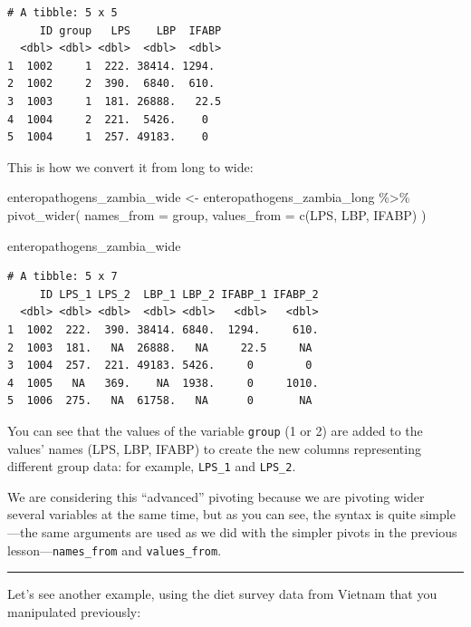 \documentclass[
  letterpaper,
  DIV=11,
  numbers=noendperiod]{scrreprt}
\newenvironment{Shaded}{\begin{snugshade}}{\end{snugshade}}
\newcommand{\AttributeTok}[1]{\textcolor[rgb]{0.40,0.45,0.13}{#1}}
\newcommand{\FunctionTok}[1]{\textcolor[rgb]{0.28,0.35,0.67}{#1}}
\newcommand{\NormalTok}[1]{\textcolor[rgb]{0.00,0.23,0.31}{#1}}
\newcommand{\OtherTok}[1]{\textcolor[rgb]{0.00,0.23,0.31}{#1}}
\newcommand{\SpecialCharTok}[1]{\textcolor[rgb]{0.37,0.37,0.37}{#1}}
\begin{document}
\begin{verbatim}
# A tibble: 5 x 5
     ID group   LPS    LBP  IFABP
  <dbl> <dbl> <dbl>  <dbl>  <dbl>
1  1002     1  222. 38414. 1294. 
2  1002     2  390.  6840.  610. 
3  1003     1  181. 26888.   22.5
4  1004     2  221.  5426.    0  
5  1004     1  257. 49183.    0  
\end{verbatim}

This is how we convert it from long to wide:

\begin{Shaded}
\begin{Highlighting}[]
\NormalTok{enteropathogens\_zambia\_wide }\OtherTok{\textless{}{-}}
\NormalTok{  enteropathogens\_zambia\_long }\SpecialCharTok{\%\textgreater{}\%}
  \FunctionTok{pivot\_wider}\NormalTok{(}
    \AttributeTok{names\_from =}\NormalTok{ group,}
    \AttributeTok{values\_from =} \FunctionTok{c}\NormalTok{(LPS, LBP, IFABP)}
\NormalTok{  )}

\NormalTok{enteropathogens\_zambia\_wide}
\end{Highlighting}
\end{Shaded}

\begin{verbatim}
# A tibble: 5 x 7
     ID LPS_1 LPS_2  LBP_1 LBP_2 IFABP_1 IFABP_2
  <dbl> <dbl> <dbl>  <dbl> <dbl>   <dbl>   <dbl>
1  1002  222.  390. 38414. 6840.  1294.     610.
2  1003  181.   NA  26888.   NA     22.5     NA 
3  1004  257.  221. 49183. 5426.     0        0 
4  1005   NA   369.    NA  1938.     0     1010.
5  1006  275.   NA  61758.   NA      0       NA 
\end{verbatim}

You can see that the values of the variable \texttt{group} (1 or 2) are
added to the values' names (LPS, LBP, IFABP) to create the new columns
representing different group data: for example, \texttt{LPS\_1} and
\texttt{LPS\_2}.

We are considering this ``advanced'' pivoting because we are pivoting
wider several variables at the same time, but as you can see, the syntax
is quite simple---the same arguments are used as we did with the simpler
pivots in the previous lesson---\texttt{names\_from} and
\texttt{values\_from}.

\begin{center}\rule{0.5\linewidth}{0.5pt}\end{center}

Let's see another example, using the diet survey data from Vietnam that
you manipulated previously:
\end{document}

